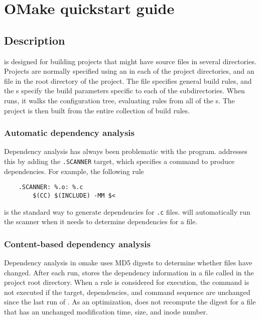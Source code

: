 %
%
\chapter{OMake quickstart guide}
\label{chapter:quickstart}

\section{Description}

 is designed for building projects that might have source files in several directories.
Projects are normally specified using an  in each of the project directories, and an
 file in the root directory of the project.  The  file specifies
general build rules, and the s specify the build parameters specific to each of the
subdirectories.  When  runs, it walks the configuration tree, evaluating rules from all
of the s.  The project is then built from the entire collection of build rules.

\subsection{Automatic dependency analysis}

Dependency analysis has always been problematic with the  program.  
addresses this by adding the \verb+.SCANNER+ target, which specifies a command to produce
dependencies.  For example, the following rule

\begin{verbatim}
    .SCANNER: %.o: %.c
        $(CC) $(INCLUDE) -MM $<
\end{verbatim}

is the standard way to generate dependencies for \verb+.c+ files.   will automatically
run the scanner when it needs to determine dependencies for a file.

\subsection{Content-based dependency analysis}

Dependency analysis in omake uses MD5 digests to determine whether files have changed.  After each
run,  stores the dependency information in a file called  in the project
root directory.  When a rule is considered for execution, the command is not executed if the target,
dependencies, and command sequence are unchanged since the last run of .  As an
optimization,  does not recompute the digest for a file that has an unchanged
modification time, size, and inode number.

